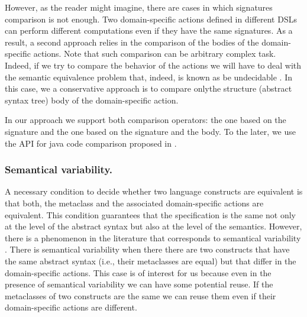 However, as the reader might imagine, there are cases in which signatures comparison is not enough. Two domain-specific actions defined in different DSLs can perform different computations even if they have the same signatures. As a result, a second approach relies in the comparison of the bodies of the domain-specific actions. Note that such comparison can be arbitrary complex task. Indeed, if we try to compare  the behavior of the actions we will have to deal with the semantic equivalence problem that, indeed, is known as be undecidable \cite{Lucanu:2013}. In this case, we a conservative approach is to compare onlythe structure (abstract syntax tree) body of the domain-specific action.

In our approach we support both comparison operators: the one based on the signature and the one based on the signature and the body. To the later, we use the API for java code comparison proposed in \cite{Biegel:2010}. 

\vspace{-2mm}
\subsubsection{Semantical variability.} A necessary condition to decide whether two language constructs are equivalent is that both, the metaclass and the associated domain-specific actions are equivalent. This condition guarantees that the specification is the same not only at the level of the abstract syntax but also at the level of the semantics. However, there is a phenomenon in the literature that corresponds to semantical variability \cite{Cengarle:2009}. There is semantical variability when there there are two constructs that have the same abstract syntax (i.e., their metaclasses are equal) but that differ in the domain-specific actions. This case is of interest for us because even in the presence of semantical variability we can have some potential reuse. If the metaclasses of two constructs are the same we can reuse them even if their domain-specific actions are different. 

